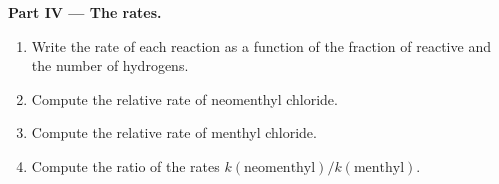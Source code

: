 \begin{problem}
\medskip
\noindent\textbf{Part IV --- The rates.}
\begin{enumerate}[resume]
  \item Write the rate of each reaction as a function of the fraction of
        reactive  and the number of  hydrogens.
  \item Compute the relative rate of neomenthyl chloride.
  \item Compute the relative rate of menthyl chloride.
  \item Compute the ratio of the rates $k(\text{neomenthyl})/k(\text{menthyl})$.
\end{enumerate}
\end{problem}
